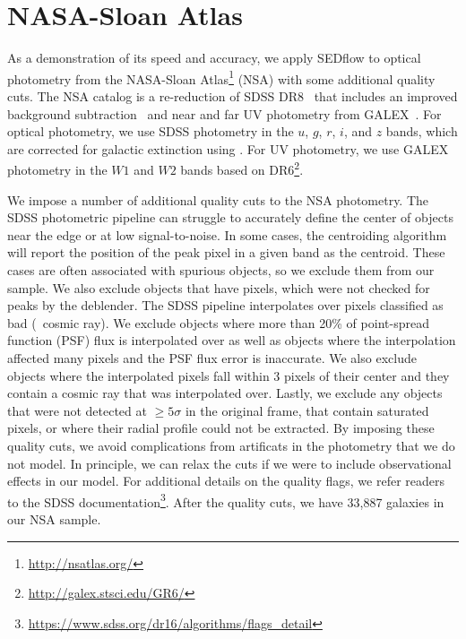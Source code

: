 \section{NASA-Sloan Atlas} \label{sec:obs}
As a demonstration of its speed and accuracy, we apply {\sc SEDflow} to optical
photometry from the NASA-Sloan Atlas\footnote{\url{http://nsatlas.org/}} (NSA)
with some additional quality cuts.
The NSA catalog is a re-reduction of SDSS DR8~\citep{aihara2011} that includes
an improved background subtraction~\citep{blanton2011} and near and far UV
photometry from GALEX~\citep{}.
For optical photometry, we use SDSS photometry in the $u$, $g$, $r$, $i$, and
$z$ bands, which are corrected for galactic extinction using
\cite{schlegel1998}.
For UV photometry, we use GALEX photometry in the $W1$ and $W2$ bands based on
DR6\footnote{\url{http://galex.stsci.edu/GR6/}}.

We impose a number of additional quality cuts to the NSA photometry.
The SDSS photometric pipeline can struggle to accurately define the center
of objects near the edge or at low signal-to-noise. 
In some cases, the centroiding algorithm will report the position of the peak
pixel in a given band as the centroid. 
These cases are often associated with spurious objects, so we exclude them
from our sample. 
We also exclude objects that have pixels, which were not checked for peaks
by the deblender. %
The SDSS pipeline interpolates over pixels classified as bad (\eg~cosmic ray).
We exclude objects where more than 20\% of point-spread function (PSF) flux is
interpolated over as well as objects where the interpolation affected many
pixels and the PSF flux error is inaccurate. 
We also exclude objects where the interpolated pixels fall within 3 pixels of
their center and they contain a cosmic ray that was interpolated over.
Lastly, we exclude any objects that were not detected at $\ge5\sigma$ in the
original frame, that contain saturated pixels, or where their radial profile 
could not be extracted.
By imposing these quality cuts, we avoid complications from artificats in the
photometry that we do not model. 
In principle, we can relax the cuts if we were to include observational effects
in our model.
For additional details on the quality flags, we refer readers to the SDSS
documentation\footnote{\url{https://www.sdss.org/dr16/algorithms/flags_detail}}.
After the quality cuts, we have 33,887 galaxies in our NSA sample.




